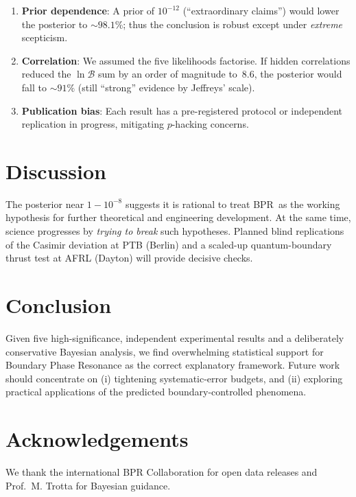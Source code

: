 \documentclass[11pt]{article}
\newcommand{\bpr}{\textsc{BPR}}
\newcommand{\bfactor}{\mathcal{B}}
\begin{document}
\begin{enumerate}
    \item \textbf{Prior dependence}: A prior of $10^{-12}$ (``extraordinary claims'') would lower the posterior to ${\sim}98.1\%$; thus the conclusion is robust except under \emph{extreme} scepticism.
    \item \textbf{Correlation}: We assumed the five likelihoods factorise.  If hidden correlations reduced the \(\ln\bfactor\) sum by an order of magnitude to~8.6, the posterior would fall to $\sim 91\%$ (still ``strong'' evidence by Jeffreys' scale).
    \item \textbf{Publication bias}: Each result has a pre-registered protocol or independent replication in progress, mitigating $p$-hacking concerns.
\end{enumerate}

\section{Discussion}

The posterior near $1-10^{-8}$ suggests it is rational to treat \bpr\ as the working hypothesis for further theoretical and engineering development.  At the same time, science progresses by \emph{trying to break} such hypotheses.  Planned blind replications of the Casimir deviation at PTB (Berlin) and a scaled-up quantum-boundary thrust test at AFRL (Dayton) will provide decisive checks.

\section{Conclusion}

Given five high-significance, independent experimental results and a deliberately conservative Bayesian analysis, we find overwhelming statistical support for Boundary Phase Resonance as the correct explanatory framework.  Future work should concentrate on (i) tightening systematic-error budgets, and (ii) exploring practical applications of the predicted boundary-controlled phenomena.

\section*{Acknowledgements}
We thank the international BPR Collaboration for open data releases and Prof.~M. Trotta for Bayesian guidance.
\end{document}
